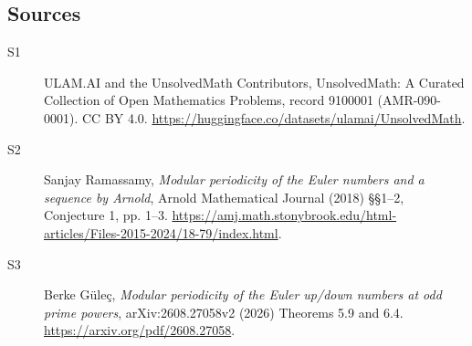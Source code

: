 \documentclass[11pt]{article}
\begin{document}
\subsection{Sources}
\begin{description}
\item[\hypertarget{source:9100001:1}{S1}] ULAM.AI and the UnsolvedMath Contributors, UnsolvedMath: A Curated Collection of Open Mathematics Problems, record 9100001 (AMR-090-0001). CC BY 4.0. \url{https://huggingface.co/datasets/ulamai/UnsolvedMath}.
\item[\hypertarget{source:9100001:2}{S2}] Sanjay Ramassamy, \emph{Modular periodicity of the Euler numbers and a sequence by Arnold}, Arnold Mathematical Journal (2018) \S\S1--2, Conjecture 1, pp. 1--3. \url{https://amj.math.stonybrook.edu/html-articles/Files-2015-2024/18-79/index.html}.
\item[\hypertarget{source:9100001:3}{S3}] Berke G\"ule\c{c}, \emph{Modular periodicity of the Euler up/down numbers at odd prime powers}, arXiv:2608.27058v2 (2026) Theorems 5.9 and 6.4. \url{https://arxiv.org/pdf/2608.27058}.
\end{description}
\label{end:9100001}
\end{document}

